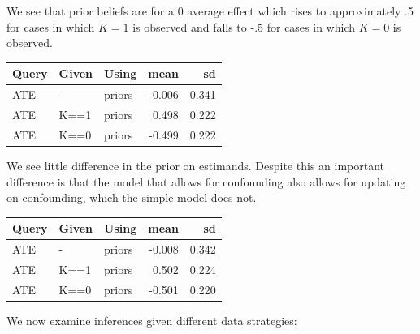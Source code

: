 \documentclass[12pt,]{book}
\begin{document}
We see that prior beliefs are for a 0 average effect which rises to approximately .5 for cases in which \(K=1\) is observed and falls to -.5 for cases in which \(K=0\) is observed.

\begin{tabular}{l|l|l|r|r}
\hline
Query & Given & Using & mean & sd\\
\hline
ATE & - & priors & -0.006 & 0.341\\
\hline
ATE & K==1 & priors & 0.498 & 0.222\\
\hline
ATE & K==0 & priors & -0.499 & 0.222\\
\hline
\end{tabular}

We see little difference in the prior on estimands. Despite this an important difference is that the model that allows for confounding also allows for updating on confounding, which the simple model does not.

\begin{tabular}{l|l|l|r|r}
\hline
Query & Given & Using & mean & sd\\
\hline
ATE & - & priors & -0.008 & 0.342\\
\hline
ATE & K==1 & priors & 0.502 & 0.224\\
\hline
ATE & K==0 & priors & -0.501 & 0.220\\
\hline
\end{tabular}

We now examine inferences given different data strategies:
\end{document}
